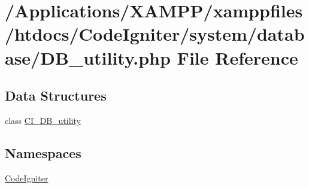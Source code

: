 \hypertarget{_d_b__utility_8php}{}\section{/\+Applications/\+X\+A\+M\+P\+P/xamppfiles/htdocs/\+Code\+Igniter/system/database/\+D\+B\+\_\+utility.php File Reference}
\label{_d_b__utility_8php}
\subsection*{Data Structures}
\begin{DoxyCompactItemize}
\item 
class \mbox{\hyperlink{class_c_i___d_b__utility}{C\+I\+\_\+\+D\+B\+\_\+utility}}
\end{DoxyCompactItemize}
\subsection*{Namespaces}
\begin{DoxyCompactItemize}
\item 
 \mbox{\hyperlink{namespace_code_igniter}{Code\+Igniter}}
\end{DoxyCompactItemize}
